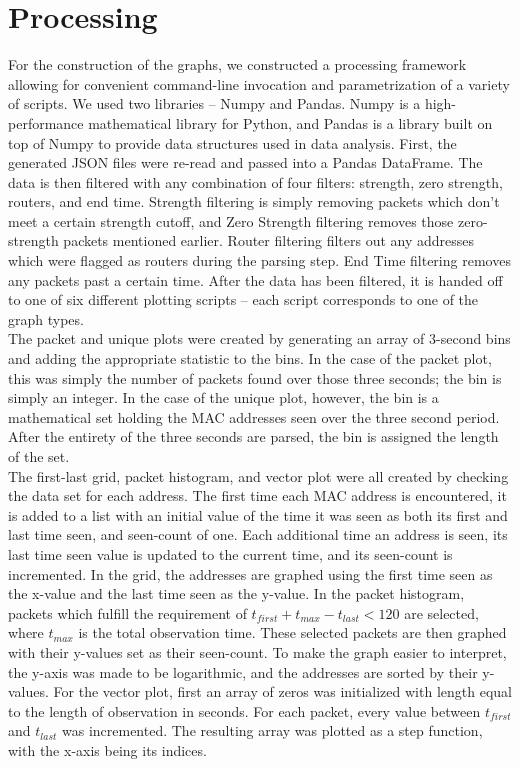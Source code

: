 \documentclass[letterpaper,abstract=on,titlepage=false]{scrreprt}
\begin{document}
	\section*{Processing}
    For the construction of the graphs, we constructed a processing framework allowing for convenient command-line invocation and parametrization of a variety of scripts.
		We used two libraries -- Numpy and Pandas.
    Numpy is a high-performance mathematical library for Python, and Pandas is a library built on top of Numpy to provide data structures used in data analysis.
    First, the generated JSON files were re-read and passed into a Pandas DataFrame.
    The data is then filtered with any combination of four filters: strength, zero strength, routers, and end time.
    Strength filtering is simply removing packets which don't meet a certain strength cutoff, and Zero Strength filtering removes those zero-strength packets mentioned earlier.
    Router filtering filters out any addresses which were flagged as routers during the parsing step.
    End Time filtering removes any packets past a certain time.
    After the data has been filtered, it is handed off to one of six different plotting scripts -- each script corresponds to one of the graph types.\\

The packet and unique plots were created by generating an array of 3-second bins and adding the appropriate statistic to the bins.
In the case of the packet plot, this was simply the number of packets found over those three seconds; the bin is simply an integer.
In the case of the unique plot, however, the bin is a mathematical set holding the MAC addresses seen over the three second period.
After the entirety of the three seconds are parsed, the bin is assigned the length of the set.\\

The first-last grid, packet histogram, and vector plot were all created by checking the data set for each address.
The first time each MAC address is encountered, it is added to a list with an initial value of the time it was seen as both its first and last time seen, and seen-count of one.
Each additional time an address is seen, its last time seen value is updated to the current time, and its seen-count is incremented.
In the grid, the addresses are graphed using the first time seen as the x-value and the last time seen as the y-value.
In the packet histogram, packets which fulfill the requirement of \(t_{first} + t_{max} - t_{last} < 120\) are selected, where \(t_{max}\) is the total observation time.
These selected packets are then graphed with their y-values set as their seen-count.
To make the graph easier to interpret, the y-axis was made to be logarithmic, and the addresses are sorted by their y-values.
For the vector plot, first an array of zeros was initialized with length equal to the length of observation in seconds.
For each packet, every value between \(t_{first}\) and \(t_{last}\) was incremented.
The resulting array was plotted as a step function, with the x-axis being its indices.\\
\end{document}

